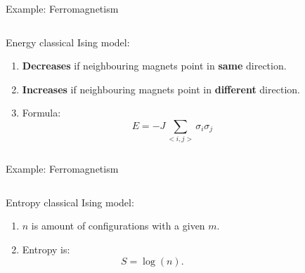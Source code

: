 \documentclass{beamer}
\begin{document}
\begin{frame}{Example: Ferromagnetism}
	\begin{columns}
		\begin{column}{0.5\textwidth}
			Energy classical Ising model:
			\begin{enumerate}
				\pause
				\item \textbf{Decreases} if neighbouring magnets point in \textbf{same} direction.
				\pause
				\item \textbf{Increases} if neighbouring magnets point in \textbf{different} direction.
				\pause
				\item Formula:\[E=-J\sum_{<i,j>}\sigma_i\sigma_j\]
			\end{enumerate}
		\end{column}
		\begin{column}{0.5\textwidth}
			\begin{center}
				
			\end{center}
		\end{column}
	\end{columns}
\end{frame}

\begin{frame}{Example: Ferromagnetism}
	\begin{columns}
		\begin{column}{0.5\textwidth}
			Entropy classical Ising model:
			\begin{enumerate}
				\item $n$ is amount of configurations with a given $m$.
				\item Entropy is:
				\[S=\log(n).\]
				\pause
			\end{enumerate}
		\end{column}
		\begin{column}{0.5\textwidth}
			\begin{center}
				
			\end{center}
		\end{column}
	\end{columns}
\end{frame}
\end{document}
